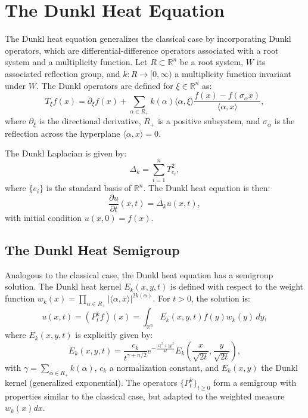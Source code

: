 \documentclass[a4paper,12pt]{article}
\begin{document}
\section{The Dunkl Heat Equation}
The Dunkl heat equation generalizes the classical case by incorporating Dunkl operators, which are differential-difference operators associated with a root system and a multiplicity function. Let $R \subset \mathbb{R}^n$ be a root system, $W$ its associated reflection group, and $k: R \to [0,\infty)$ a multiplicity function invariant under $W$. The Dunkl operators are defined for $\xi \in \mathbb{R}^n$ as:
\begin{equation}
T_\xi f(x) = \partial_\xi f(x) + \sum_{\alpha \in R_+} k(\alpha) \langle \alpha, \xi \rangle \frac{f(x) - f(\sigma_\alpha x)}{\langle \alpha, x \rangle},
\end{equation}
where $\partial_\xi$ is the directional derivative, $R_+$ is a positive subsystem, and $\sigma_\alpha$ is the reflection across the hyperplane $\langle \alpha, x \rangle = 0$.

The Dunkl Laplacian is given by:
\begin{equation}
\Delta_k = \sum_{i=1}^n T_{e_i}^2,
\end{equation}
where $\{e_i\}$ is the standard basis of $\mathbb{R}^n$. The Dunkl heat equation is then:
\begin{equation}
\frac{\partial u}{\partial t}(x,t) = \Delta_k u(x,t),
\end{equation}
with initial condition $u(x,0) = f(x)$.

\subsection{The Dunkl Heat Semigroup}
Analogous to the classical case, the Dunkl heat equation has a semigroup solution. The Dunkl heat kernel $E_k(x,y,t)$ is defined with respect to the weight function $w_k(x) = \prod_{\alpha \in R_+} |\langle \alpha, x \rangle|^{2k(\alpha)}$. For $t > 0$, the solution is:
\begin{equation}
u(x,t) = (P_t^k f)(x) = \int_{\mathbb{R}^n} E_k(x,y,t) f(y) w_k(y) \, dy,
\end{equation}
where $E_k(x,y,t)$ is explicitly given by:
\begin{equation}
E_k(x,y,t) = \frac{c_k}{t^{\gamma + n/2}} e^{-\frac{|x|^2 + |y|^2}{4t}} E_k\left(\frac{x}{\sqrt{2t}}, \frac{y}{\sqrt{2t}}\right),
\end{equation}
with $\gamma = \sum_{\alpha \in R_+} k(\alpha)$, $c_k$ a normalization constant, and $E_k(x,y)$ the Dunkl kernel (generalized exponential). The operators $\{P_t^k\}_{t \geq 0}$ form a semigroup with properties similar to the classical case, but adapted to the weighted measure $w_k(x) dx$.
\end{document}

